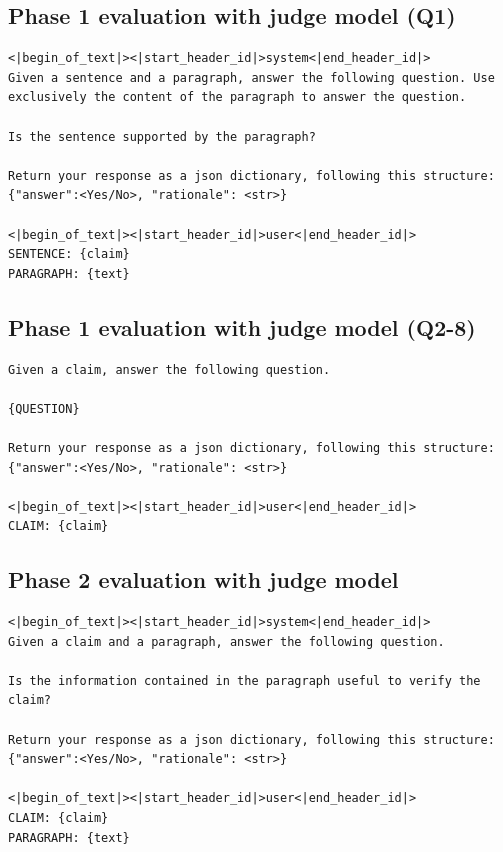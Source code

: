 \documentclass[11pt]{article}
\begin{document}
\subsection{Phase 1 evaluation with judge model (Q1)}
\begin{lstlisting}[breaklines=true, columns=flexible, basicstyle=\footnotesize]
<|begin_of_text|><|start_header_id|>system<|end_header_id|>
Given a sentence and a paragraph, answer the following question. Use exclusively the content of the paragraph to answer the question. 

Is the sentence supported by the paragraph?

Return your response as a json dictionary, following this structure: {"answer":<Yes/No>, "rationale": <str>}

<|begin_of_text|><|start_header_id|>user<|end_header_id|>
SENTENCE: {claim}
PARAGRAPH: {text}
\end{lstlisting}

\subsection{Phase 1 evaluation with judge model (Q2-8)}
\begin{lstlisting}[breaklines=true, columns=flexible, basicstyle=\footnotesize]
Given a claim, answer the following question. 

{QUESTION}

Return your response as a json dictionary, following this structure: {"answer":<Yes/No>, "rationale": <str>}

<|begin_of_text|><|start_header_id|>user<|end_header_id|>
CLAIM: {claim}

\end{lstlisting}

\subsection{Phase 2 evaluation with judge model}
\begin{lstlisting}[breaklines=true, columns=flexible, basicstyle=\footnotesize]
<|begin_of_text|><|start_header_id|>system<|end_header_id|>
Given a claim and a paragraph, answer the following question. 

Is the information contained in the paragraph useful to verify the claim?

Return your response as a json dictionary, following this structure: {"answer":<Yes/No>, "rationale": <str>}

<|begin_of_text|><|start_header_id|>user<|end_header_id|>
CLAIM: {claim}
PARAGRAPH: {text}
\end{lstlisting}
\end{document}
